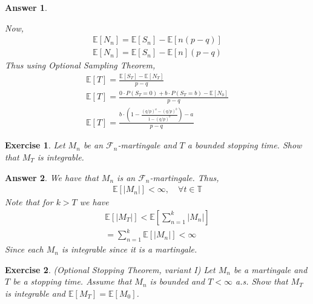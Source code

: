 \documentclass[12pt]{article}
\theoremstyle{colon}
\newtheorem{exercise}{Exercise}
\newtheorem*{answer}{Answer}
\begin{document}
\begin{answer}
\begin{enumerate}[label=\alph*)]
      Now,
      \begin{gather*}
        \mathbb{E}[N_n] = \mathbb{E}[S_n] - \mathbb{E}[n(p-q)] \\
        \mathbb{E}[N_n] = \mathbb{E}[S_n] - \mathbb{E}[n](p-q)
      \end{gather*}
      Thus using Optional Sampling Theorem,
      \begin{gather*}
        \mathbb{E}[T] = \frac{\mathbb{E}[S_T] - \mathbb{E}[N_T]}{p-q} \\
        \mathbb{E}[T] = \frac{0 \cdot P(S_T = 0) + b \cdot P(S_T = b) - \mathbb{E}[N_0]}{p-q} \\
        \mathbb{E}[T] = \frac{b \cdot (1 - \frac{(q/p)^a - (q/p)^b}{1 - (q/p)^b}) - a}{p-q}
      \end{gather*}
  \end{enumerate}
\end{answer}

\clearpage

\begin{exercise}
  Let $M_n$ be an $\mathcal{F}_n$-martingale and $T$ a bounded stopping time. Show that $M_T$ is integrable.
\end{exercise}

\begin{answer}
  We have that $M_n$ is an $\mathcal{F}_n$-martingale. Thus,
  \begin{gather*}
    \mathbb{E}[ \lvert M_n \rvert ] < \infty, \quad \forall t \in \mathbb{T}
  \end{gather*}
  Note that for $k > T$ we have
  \begin{gather*}
    \mathbb{E}[ \lvert M_T \rvert ] < \mathbb{E}[ \sum_{n = 1}^k \lvert M_n \rvert ] \\
    = \sum_{n = 1}^k \mathbb{E}[ \lvert M_n \rvert ] < \infty
  \end{gather*}
  Since each $M_n$ is integrable since it is a martingale.
\end{answer}

\clearpage

\begin{exercise}
  (Optional Stopping Theorem, variant I) Let $M_n$ be a martingale and $T$ be a stopping time. Assume that $M_n$ is bounded and $T < \infty$ a.s. Show that $M_T$ is integrable and $\mathbb{E}[M_T] = \mathbb{E}[M_0]$.
\end{exercise}
\end{document}
